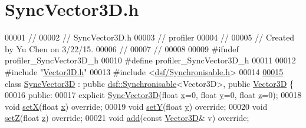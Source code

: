 \hypertarget{_sync_vector3_d_8h_source}{}\section{Sync\+Vector3\+D.\+h}
\label{_sync_vector3_d_8h_source}

\begin{DoxyCode}
00001 \textcolor{comment}{//}
00002 \textcolor{comment}{//  SyncVector3D.h}
00003 \textcolor{comment}{//  profiler}
00004 \textcolor{comment}{//}
00005 \textcolor{comment}{//  Created by Yu Chen on 3/22/15.}
00006 \textcolor{comment}{//}
00007 \textcolor{comment}{//}
00008 
00009 \textcolor{preprocessor}{#ifndef profiler\_SyncVector3D\_h}
00010 \textcolor{preprocessor}{#define profiler\_SyncVector3D\_h}
00011 
00012 \textcolor{preprocessor}{#include "\hyperlink{_vector3_d_8h}{Vector3D.h}"}
00013 \textcolor{preprocessor}{#include <\hyperlink{_synchronisable_8h}{dsf/Synchronisable.h}>}
00014 
\hypertarget{_sync_vector3_d_8h_source_l00015}{}\hyperlink{class_sync_vector3_d}{00015} \textcolor{keyword}{class }\hyperlink{class_sync_vector3_d}{SyncVector3D} : \textcolor{keyword}{public} \hyperlink{classdsf_1_1_synchronisable}{dsf::Synchronisable}<Vector3D>, \textcolor{keyword}{public} 
      \hyperlink{class_vector3_d}{Vector3D} \{
00016 \textcolor{keyword}{public}:
00017     \textcolor{keyword}{explicit} \hyperlink{class_sync_vector3_d_a58df77cc374692447265c2a6356635ba}{SyncVector3D}(\textcolor{keywordtype}{float} \hyperlink{class_vector3_d_aca5d15bdb846448e3cb73b072783f329}{x}=0, \textcolor{keywordtype}{float} \hyperlink{class_vector3_d_a9b6d194fcf526d7d4f9e902421285e94}{y}=0, \textcolor{keywordtype}{float} \hyperlink{class_vector3_d_af9728f1eba23b9ee091755346214f391}{z}=0);
00018     \textcolor{keywordtype}{void} \hyperlink{class_sync_vector3_d_a281c1fdd14cf470374f97c03e80b9051}{setX}(\textcolor{keywordtype}{float} \hyperlink{class_vector3_d_aca5d15bdb846448e3cb73b072783f329}{x}) \textcolor{keyword}{override};
00019     \textcolor{keywordtype}{void} \hyperlink{class_sync_vector3_d_a5d3dc3a35ff906da6e26e774c49efe98}{setY}(\textcolor{keywordtype}{float} \hyperlink{class_vector3_d_a9b6d194fcf526d7d4f9e902421285e94}{y}) \textcolor{keyword}{override};
00020     \textcolor{keywordtype}{void} \hyperlink{class_sync_vector3_d_ab46ef5a61256a8c8eeef7028efc4d418}{setZ}(\textcolor{keywordtype}{float} \hyperlink{class_vector3_d_af9728f1eba23b9ee091755346214f391}{z}) \textcolor{keyword}{override};
00021     \textcolor{keywordtype}{void} \hyperlink{class_sync_vector3_d_a15fde3ee61d3c112b5badeb59a9576c4}{add}(\textcolor{keyword}{const} \hyperlink{class_vector3_d}{Vector3D}& v) \textcolor{keyword}{override};

\end{DoxyCode}
